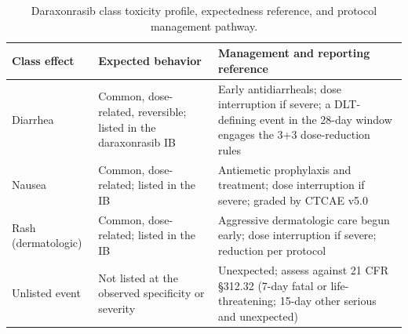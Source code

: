 \begin{table}[t]
\caption{Daraxonrasib class toxicity profile, expectedness reference, and protocol management pathway.}
\label{tab:sec04-tox}
\centering
\begin{tabularx}{\textwidth}{L{3.4cm} L{4.0cm} Y}
\toprule
\textbf{Class effect} & \textbf{Expected behavior} & \textbf{Management and reporting reference} \\
\midrule
Diarrhea & Common, dose-related, reversible; listed in the daraxonrasib IB & Early antidiarrheals; dose interruption if severe; a DLT-defining event in the 28-day window engages the 3+3 dose-reduction rules \\
Nausea & Common, dose-related; listed in the IB & Antiemetic prophylaxis and treatment; dose interruption if severe; graded by CTCAE v5.0 \\
Rash (dermatologic) & Common, dose-related; listed in the IB & Aggressive dermatologic care begun early; dose interruption if severe; reduction per protocol \\
Unlisted event & Not listed at the observed specificity or severity & Unexpected; assess against 21 CFR \S 312.32 (7-day fatal or life-threatening; 15-day other serious and unexpected) \\
\bottomrule
\end{tabularx}
\end{table}

